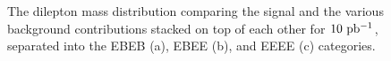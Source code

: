 \documentclass{cmspaper}
\begin{document}
 
 \begin{figure}[htb]
   \begin{center}
     \caption{The dilepton mass distribution comparing the signal and the various background contributions stacked on top of each other for $10\ \mathrm{pb^{-1}}$, separated into the EBEB (a), EBEE (b), and EEEE (c) categories. }
     \label{fig:zeeDileptonMass_Prediction}
   \end{center}
 \end{figure}
\end{document}
